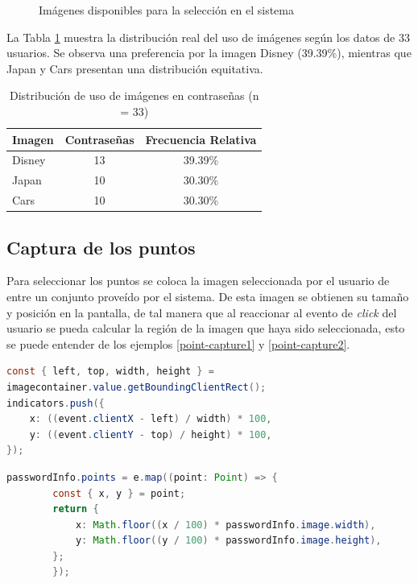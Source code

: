 \begin{figure}[ht]
	\caption{Imágenes disponibles para la selección en el sistema}
	\label{fig:imagenes-sistema}
\end{figure}

La Tabla \ref{tab:uso-imagenes} muestra la distribución real del uso de imágenes según los datos de 33 usuarios. Se observa una preferencia por la imagen Disney (39.39\%), mientras que Japan y Cars presentan una distribución equitativa.


\begin{table}[ht]
	\centering
	\caption{Distribución de uso de imágenes en contraseñas (n = 33)}
	\label{tab:uso-imagenes}
	\begin{tabularx}{0.8\textwidth}{Xcc}
		\toprule
		\textbf{Imagen} & \textbf{Contraseñas} & \textbf{Frecuencia Relativa} \\
		\midrule
		Disney & 13 & 39.39\% \\
		Japan & 10 & 30.30\% \\
		Cars & 10 & 30.30\% \\
		\bottomrule
	\end{tabularx}
	\vspace{0.2cm}

\end{table}

\subsection{Captura de los puntos}
Para seleccionar los puntos se coloca la imagen seleccionada por el usuario de entre un conjunto prove\'ido por el sistema. De esta imagen se obtienen su tama\~no y posici\'on en la pantalla, de tal manera que al reaccionar al evento de \textit{click} del usuario se pueda calcular la regi\'on de la imagen que haya sido seleccionada, esto se puede entender de los ejemplos \ref{point-capture1} y \ref{point-capture2}. 


\begin{lstlisting}[style=mystyle, language=Java, breaklines=true, caption={C\'odigo de selecci\'on de coordenadas de pantalla}, label={point-capture1}, floatplacement=H]
  const { left, top, width, height } =
imagecontainer.value.getBoundingClientRect();
indicators.push({
	x: ((event.clientX - left) / width) * 100,
	y: ((event.clientY - top) / height) * 100,
});
\end{lstlisting}

\begin{lstlisting}[breaklines=true, language=Java, caption={C\'odigo de transformaci\'on en coordenadas de imagen}, label={point-capture2}, floatplacement=H]
	passwordInfo.points = e.map((point: Point) => {
		const { x, y } = point;
		return {
			x: Math.floor((x / 100) * passwordInfo.image.width),
			y: Math.floor((y / 100) * passwordInfo.image.height),
		};
		});
\end{lstlisting}

